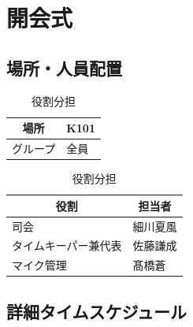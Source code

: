 \newpage
\section{開会式}  %

\subsection{場所・人員配置}
\begin{table}[h]
  \centering
  \begin{minipage}[t]{0.48\columnwidth}
    \centering
    \caption{場所・該当グループ}
    \begin{tabular}{cl}
      \hline
      場所 & K101 \\
      \hline
      グループ & 全員 \\
      \hline
    \end{tabular}
  \end{minipage}
  \begin{minipage}[t]{0.48\columnwidth}
    \centering
    \caption{役割分担}
    \begin{tabular}{ll}
      \hline
      \multicolumn{1}{c}{役割} & \multicolumn{1}{c}{担当者} \\
      \hline
      司会 & 細川夏風 \\
      タイムキーパー兼代表 & 佐藤謙成 \\
      マイク管理 & 髙橋蒼 \\
      \hline
    \end{tabular}
  \end{minipage}
\end{table}

\subsection{詳細タイムスケジュール}
\vspace{0.5em}
\fontsize{8pt}{12pt}\selectfont

